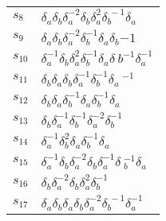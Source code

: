 \documentclass{article}
\begin{document}
\begin{center}
\begin{tabular}{ll}
$s_{8}$ & $\delta_a^{}\delta_b^{}\delta_a^{-2}\delta_b^{}\delta_a^{2}\delta_b^{\
-1}\delta_a^{}$ \\
$s_{9}$ & $\delta_a^{}\delta_b^{}\delta_a^{-2}\delta_b^{-1}\delta_a^{}\delta_b^\
{-1}$ \\
$s_{10}$ & $\delta_a^{-1}\delta_b^{}\delta_a^{2}\delta_b^{-1}\delta_a^{}\delta_\
b^{-1}\delta_a^{-1}$ \\
$s_{11}$ & $\delta_b^{}\delta_a^{}\delta_b^{}\delta_a^{-1}\delta_b^{-1}\delta_a\
^{-1}$ \\
$s_{12}$ & $\delta_b^{}\delta_a^{}\delta_b^{-1}\delta_a^{}\delta_b^{-1}\delta_a\
^{}$ \\
$s_{13}$ & $\delta_b^{}\delta_a^{-1}\delta_b^{-1}\delta_a^{-2}\delta_b^{-1}$ \\
$s_{14}$ & $\delta_a^{-1}\delta_b^{2}\delta_a^{}\delta_b^{-1}\delta_a^{}$ \\
$s_{15}$ & $\delta_a^{-1}\delta_b^{}\delta_a^{-2}\delta_b^{}\delta_a^{-1}\delta\
_b^{-1}\delta_a^{}$ \\
$s_{16}$ & $\delta_b^{}\delta_a^{-2}\delta_b^{}\delta_a^{2}\delta_b^{-1}$ \\
$s_{17}$ & $\delta_a^{}\delta_b^{}\delta_a^{}\delta_b^{}\delta_a^{-2}\delta_b^{\
-1}\delta_a^{-1}$ \\
\bottomrule
\end{tabular}
\end{center}

\thispagestyle{empty}
\end{document}
